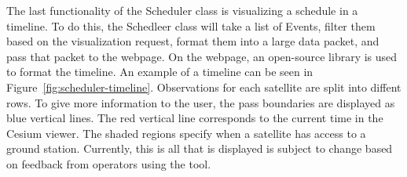 The last functionality of the Scheduler class is visualizing a schedule in a
timeline. To do this, the Schedleer class will take a list of Events, filter
them based on the visualization request, format them into a large data packet,
and pass that packet to the webpage. On the webpage, an open-source library is
used to format the timeline. An example of a timeline can be seen in
Figure~\ref{fig:scheduler-timeline}. Observations for each satellite are split
into diffent rows. To give more information to the user, the pass boundaries
are displayed as blue vertical lines. The red vertical line corresponds to the
current time in the Cesium viewer. The shaded regions specify when a satellite
has access to a ground station. Currently, this is all that is displayed is
subject to change based on feedback from operators using the tool.










